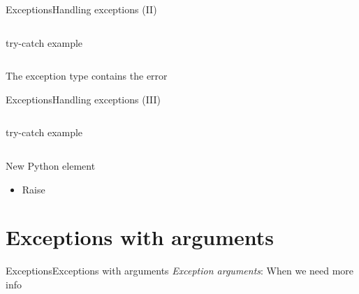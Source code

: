\documentclass[10pt,compress]{beamer} %
\begin{document}
\begin{frame}{Exceptions}{Handling exceptions (II)}
    \begin{columns}
	\begin{block}{try-catch example}
	\vspace{-0.2cm}
		
	\vspace{-0.2cm}
	\end{block}
	\end{columns}
	\bigskip
	The exception type contains the error
\end{frame}

\begin{frame}{Exceptions}{Handling exceptions (III)}
	\vspace{-0.2cm}
    \begin{columns}
	\begin{block}{try-catch example}
	\vspace{-0.2cm}
		
	\vspace{-0.2cm}
	\end{block}
	\end{columns}
	\bigskip
	New Python element
		\begin{itemize}
		\item Raise
		\end{itemize}
\end{frame}

\section{Exceptions with arguments}
\begin{frame}{Exceptions}{Exceptions with arguments}
	\vspace{-0.2cm}
	\textit{Exception arguments}: When we need more info


	\vspace{-0.2cm}
    \begin{columns}
	\begin{block}{}
	\vspace{-0.2cm}
		
	\vspace{-0.2cm}
	\end{block}

	\vspace{-0.3cm}

	\begin{block}{}
	\vspace{-0.2cm}
		
	\vspace{-0.2cm}
	\end{block}

	\end{columns}
\end{frame}
\end{document}

